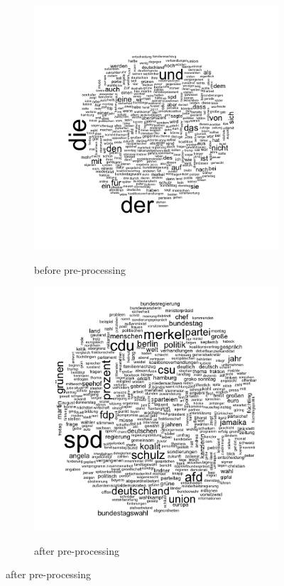 \documentclass[12pt,a4paper,notitlepage]{article}
\begin{document}
\begin{figure}[H]
	\begin{center}
	\caption{Wordclouds}
		\begin{subfigure}[normla]{0.49\textwidth}
			\caption{before pre-processing}
			\includegraphics[width=\textwidth]{../figs/wordcloud}
			\label{fig_wordcloud1}
		\end{subfigure}
		\begin{subfigure}[normla]{0.49\textwidth}
			\caption{after pre-processing}
			\includegraphics[width=\textwidth]{../figs/wordcloud_cleaned}
			\label{fig_wordcloud2}
		\end{subfigure}
	\end{center}
\end{figure}
\end{document}

